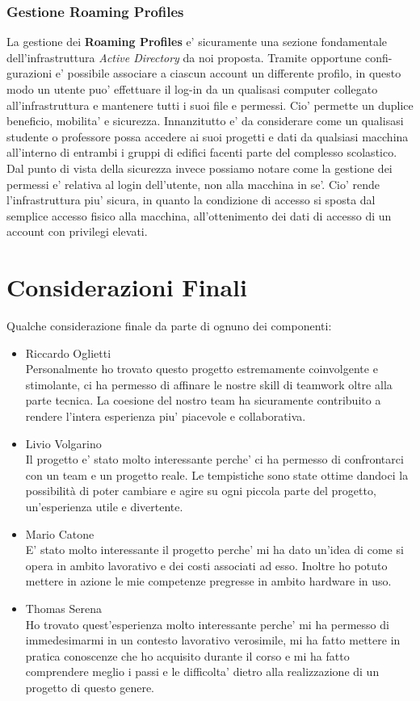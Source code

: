 \documentclass{report}
\begin{document}
			\subsection{Gestione Roaming Profiles}
				La gestione dei \textbf{Roaming Profiles} e' sicuramente una sezione fondamentale dell'infrastruttura
				\emph{Active Directory} da noi proposta. Tramite opportune confi-\\gurazioni e' possibile associare 
				a ciascun account un differente profilo, in questo modo un utente puo' effettuare il log-in da un
				qualisasi computer collegato all'infrastruttura e mantenere tutti i suoi file e permessi.
				Cio' permette un duplice beneficio, mobilita' e sicurezza. Innanzitutto e' da considerare come 
				un qualisasi studente o professore possa accedere ai suoi progetti e dati da qualsiasi macchina 
				all'interno di entrambi i gruppi di edifici facenti parte del complesso scolastico. Dal punto 
				di vista della sicurezza invece possiamo notare come la gestione dei permessi e' relativa al
				login dell'utente, non alla macchina in se'. Cio' rende l'infrastruttura piu' sicura, in quanto
				la condizione di accesso si sposta dal semplice accesso fisico alla macchina, all'ottenimento dei
				dati di accesso di un account con privilegi elevati.
	\chapter{Considerazioni Finali}
		Qualche considerazione finale da parte di ognuno dei componenti:
		\begin{itemize}
			\item Riccardo Oglietti\\
				Personalmente ho trovato questo progetto estremamente coinvolgente e stimolante, ci ha permesso di
				 affinare le nostre skill di teamwork oltre alla parte tecnica. La coesione del nostro team ha
				 sicuramente contribuito a rendere l'intera esperienza piu' piacevole e collaborativa.
			\item Livio Volgarino\\
				Il progetto e' stato molto interessante perche' ci ha permesso di confrontarci con un team e un progetto
				 reale. Le tempistiche sono state ottime dandoci la possibilità di poter cambiare e agire su ogni piccola
				 parte del progetto, un'esperienza utile e divertente. 
			\item Mario Catone\\
				E' stato molto interessante il progetto perche' mi ha dato un'idea di come si opera in ambito lavorativo
				 e dei costi associati ad esso. Inoltre ho potuto mettere in azione le mie competenze pregresse in
				 ambito hardware in uso.
			\item Thomas Serena\\
				Ho trovato quest'esperienza molto interessante perche' mi ha permesso di immedesimarmi in un contesto
				 lavorativo verosimile, mi ha fatto mettere in pratica conoscenze che ho acquisito durante il corso e
				 mi ha fatto comprendere meglio i passi e le difficolta' dietro alla realizzazione di un progetto di
				 questo genere.
		\end{itemize}
\end{document}
